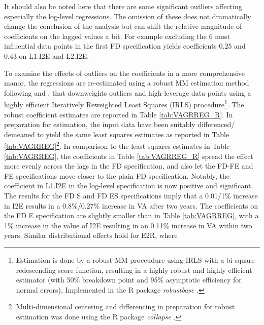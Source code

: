 \documentclass[a4paper]{article}
\begin{document}
It should also be noted here that there are some significant outliers affecting especially the log-level regressions. The omission of these does not dramatically change the conclusion of the analysis but can shift the relative magnitude of coefficients on the lagged values a bit. For example excluding the 6 most influential data points in the first FD specification yields coefficients $0.25$ and $0.43$ on L1.I2E and L2.I2E. \newline 

To examine the effects of outliers on the coefficients in a more comprehensive manor, the regressions are re-estimated using a robust MM estimation method following \citet{yohai1987high} and \citet{koller2011sharpening}, that downweights outliers and high-leverage data points using a highly efficient Iteratively Reweighted Least Squares (IRLS) procedure\footnote{Estimation is done by a robust MM proceudure using IRLS with a bi-square redescending score function, resulting in a highly robust and highly efficient estimator (with 50\% breakdown point and 95\% asymptotic efficiency for normal errors), Implemented in the R package \textit{robustbase} \citep{rousseeuw2009robustbase}.}. The robust coefficient estimates are reported in Table \ref{tab:VAGRREG_R}. In preparation for estimation, the input data have been suitably differenced/ demeaned to yield the same least squares estimates as reported in Table \ref{tab:VAGRREG}\footnote{Multi-dimensional centering and differencing in preparation for robust estimation was done using the R package \textit{collapse} \citep{collapse2021}.}. In comparison to the least squares estimates in Table \ref{tab:VAGRREG}, the coefficients in Table \ref{tab:VAGRREG_R} spread the effect more evenly across the lags in the FD specification, and also let the FD-FE and FE specifications move closer to the plain FD specification. Notably, the coefficient in L1.I2E in the log-level specification is now positive and significant. The results for the FD S and FD ES specifications imply that a 0.01/1\% increase in I2E results in a 0.8\%/0.27\% increase in VA after two years. The coefficients on the FD E specification are slightly smaller than in Table  \ref{tab:VAGRREG}, with a 1\% increase in the value of I2E resulting in an 0.11\% increase in VA within two years. Similar distributional effects hold for E2R, where 
\end{document}
